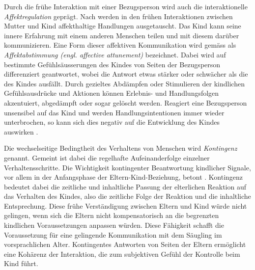 Durch die frühe Interaktion mit einer Bezugsperson wird auch die interaktionelle \textit{Affektregulation} geprägt. Nach  werden in den frühen Interaktionen zwischen Mutter und Kind affekthaltige Handlungen ausgetauscht. Das Kind kann seine innere Erfahrung mit einem anderen Menschen teilen und mit diesem darüber kommunizieren. Eine Form dieser affektiven Kommunikation wird gemäss  als \textit{Affektabstimmung (engl. affective attunement)} bezeichnet. Dabei wird auf bestimmte Gefühlsäusserungen des Kindes von Seiten der Bezugsperson differenziert geantwortet, wobei die Antwort etwas stärker oder schwächer als die des Kindes ausfällt. Durch gezieltes Abdämpfen oder Stimulieren der kindlichen Gefühlsausdrücke und Aktionen können Erlebnis- und Handlungsfolgen akzentuiert, abgedämpft oder sogar gelöscht werden. Reagiert eine Bezugsperson unsensibel auf das Kind und werden Handlungsintentionen immer wieder unterbrochen, so kann sich dies negativ auf die Entwicklung des Kindes auswirken \cite{Resch1999}.

Die wechselseitige Bedingtheit des Verhaltens von Menschen wird \textit{Kontingenz} genannt. Gemeint ist dabei die regelhafte Aufeinanderfolge einzelner Verhaltensschritte. Die Wichtigkeit kontingenter Beantwortung kindlicher Signale, vor allem in der Anfangsphase der Eltern-Kind-Beziehung, betont . Kontingenz bedeutet dabei die zeitliche und inhaltliche Passung der elterlichen Reaktion auf das Verhalten des Kindes, also die zeitliche Folge der Reaktion und die inhaltliche Entsprechung. Diese frühe Verständigung zwischen Eltern und Kind würde nicht gelingen, wenn sich die Eltern nicht kompensatorisch an die begrenzten kindlichen Voraussetzungen anpassen würden. Diese Fähigkeit schafft die Voraussetzung für eine gelingende Kommunikation mit dem Säugling im vorsprachlichen Alter. Kontingentes Antworten von Seiten der Eltern ermöglicht eine Kohärenz der Interaktion, die zum subjektiven Gefühl der Kontrolle beim Kind führt.

